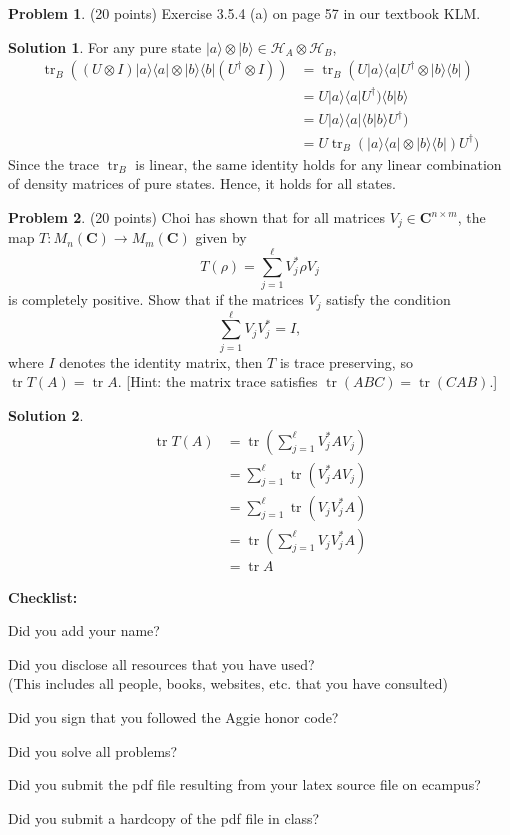 \documentclass{article}
\theoremstyle{definition}
\newtheorem{problem}{Problem}
\newtheorem*{solution}{Solution}
\newcommand{\ket}[1]{|#1\rangle}
\newcommand{\bra}[1]{\langle#1|}
\newcommand{\C}{\mathbf{C}}
\DeclareMathOperator{\tr}{tr}
\newcommand{\checklist}{\noindent\textbf{Checklist:}
\begin{compactitem}[$\Box$] 
\item Did you add your name? 
\item Did you disclose all resources that you have used? \\
(This includes all people, books, websites, etc. that you have consulted)
\item Did you sign that you followed the Aggie honor code? 
\item Did you solve all problems? 
\item Did you submit the pdf file resulting from your latex source
  file on ecampus? 
\item Did you submit a hardcopy of the pdf file in class? 
\end{compactitem}
}
\begin{document}
\begin{problem}{(20 points)}
Exercise 3.5.4 (a) on page 57 in our textbook KLM. 
\end{problem}
\begin{solution}
For any pure state $\ket{a} \otimes \ket{b} \in \mathcal{H}_A \otimes \mathcal{H}_B$,
\begin{align*}
\tr_B((U \otimes I) \ket{a} \bra{a} \otimes \ket{b} \bra{b} (U^\dagger \otimes I)) 
& = \tr_B(U \ket{a} \bra{a} U^\dagger \otimes \ket{b} \bra{b}) 
\\  & = U \ket{a} \bra{a} U^\dagger) \langle b | b \rangle 
\\  & = U \ket{a} \bra{a} \langle b | b \rangle  U^\dagger)  
\\  & = U \tr_B(\ket{a} \bra{a} \otimes \ket{b} \bra{b})   U^\dagger)  
\end{align*}
Since the trace $\tr_B$ is linear, the same identity holds for any linear
combination of density matrices of pure states.  Hence, it holds for all states.
\end{solution}

\begin{problem}{(20 points)}
Choi has shown that for all matrices $V_j\in \C^{n\times m}$, the map 
$T\colon M_n(\C) \rightarrow M_m(\C)$ given by 
$$ T(\rho)  = \sum_{j=1}^\ell V_j^* \rho V_j$$
is completely positive. Show that if the matrices $V_j$ satisfy the
condition
$$ \sum_{j=1}^\ell V_jV_j^* = I,$$
where $I$ denotes the identity matrix, then $T$ is trace preserving,
so $\tr T(A) = \tr A$. [Hint: the matrix trace satisfies $\tr(ABC)=\tr(CAB)$.]
\end{problem}
\begin{solution}
\begin{align*}
\tr T(A) & = \tr \left( \sum_{j=1}^\ell V_j^* A V_j \right)
\\ & =  \sum_{j=1}^\ell \tr (V_j^* A V_j)
\\ & =  \sum_{j=1}^\ell \tr (V_j V_j^* A )
\\ & =  \tr \left( \sum_{j=1}^\ell  V_j V_j^* A \right)
\\ & =  \tr  A 
\end{align*}

\end{solution}


\goodbreak
\checklist
\end{document}
